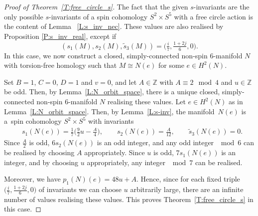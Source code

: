 \documentclass[pdftex]{sigma}
\numberwithin{equation}{section}
\theoremstyle{definition}
\numberwithin{table}{section}
\newcommand{\Z}{\mathbb{Z}}
\begin{document}
\begin{proof}[Proof of Theorem~\ref{T:free_circle_s}]
	The fact that the given $s$-invariants are the only possible $s$-invariants of a spin cohomology $S^2\times S^5$ with a free circle action is the content of Lemma~ \ref{L:s_inv_nec}. These values are also realised by Proposition \ref{P:s_inv_real}, except if
	\[ (s_1(M),s_2(M),\tilde{s}_3(M))=\bigl( \tfrac{i}{7},\tfrac{1+2j}{6},0 \bigr). \]
	In this case, we now construct a closed, simply-connected non-spin $6$-manifold $N$ with torsion-free homology such that $M\cong N(e)$ for some $e\in H^2(N)$.
	
	Set $B=1$, $C=0$, $D=1$ and $v=0$, and let $A\in\Z$ with $A\equiv 2\mod4$ and $u\in\Z$ be odd. Then, by Lemma~\ref{L:N_orbit_space}, there is a unique closed, simply-connected non-spin $6$-manifold $N$ realising these values. Let $e\in H^2(N)$ as in Lemma~\ref{L:N_orbit_space}. Then, by Lemma~\ref{L:s-inv}, the manifold~$N(e)$ is a~spin cohomology $S^2\times S^5$ with invariants
	\begin{align*}
		&s_1(N(e))=\frac{1}{7}\biggl( \frac{9}{2}u-\frac{A}{4} \biggr),\qquad
		s_2(N(e))=\frac{A}{12},\qquad
		\tilde{s}_3(N(e))=0.
	\end{align*}
	Since $\frac{A}{2}$ is odd, $6s_2(N(e))$ is an odd integer, and any odd integer $\mod6$ can be realised by choosing $A$ appropriately. Since $u$ is odd, $7s_1(N(e))$ is an integer, and by choosing $u$ appropriately, any integer $\mod7$ can be realised.
	
	Moreover, we have $p_1(N)(e)=48u+A$. Hence, since for each fixed triple $\bigl(\tfrac{i}{7},\frac{1+2j}{6},0\bigr)$ of invariants we can choose $u$ arbitrarily large, there are an infinite number of values realising these values. This proves Theorem~\ref{T:free_circle_s} in this case.
	

\end{proof}
\end{document}
